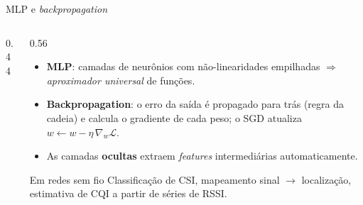 \documentclass[aspectratio=169,11pt]{beamer}
\begin{document}
\begin{frame}{MLP e \emph{backpropagation}}
  \begin{columns}
    \begin{column}{0.44\textwidth}
      \begin{center}
      \end{center}
    \end{column}
    \begin{column}{0.56\textwidth}
      \begin{itemize}
        \item \textbf{MLP}: camadas de neurônios com não-linearidades empilhadas $\Rightarrow$ \emph{aproximador universal} de funções.
        \item \textbf{Backpropagation}: o erro da saída é propagado para trás (regra da cadeia) e calcula o gradiente de cada peso; o SGD atualiza $w \leftarrow w - \eta\,\nabla_w \mathcal{L}$.
        \item As camadas \textbf{ocultas} extraem \emph{features} intermediárias automaticamente.
      \end{itemize}
      \begin{exampleblock}{Em redes sem fio}
        Classificação de CSI, mapeamento sinal $\to$ localização, estimativa de CQI a partir de séries de RSSI.
      \end{exampleblock}
    \end{column}
  \end{columns}
\end{frame}
\end{document}
